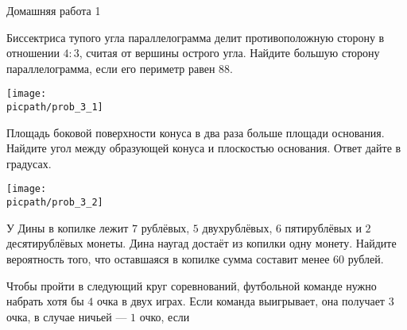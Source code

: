 \begin{class}[number=2]
	\begin{listofex}
		\item 
	\end{listofex}
\end{class}

\begin{homework}[number=1]
	\begin{listofex}
		\item Домашняя работа 1
	\end{listofex}
\end{homework}

\begin{class}[number=3]
	\begin{listofex}
		\item
		\begin{minipage}[t]{\bodywidth}
			Биссектриса тупого угла параллелограмма делит противоположную сторону в отношении \( 4 : 3 \), считая от вершины острого угла. Найдите большую сторону параллелограмма, если его периметр равен \( 88 \).
			\foranswer
		\end{minipage}
		\gapwidth
		\begin{minipage}[t]{\picwidth}
			\texttt{[image: \\picpath/prob\_3\_1]}
		\end{minipage}
		\item
		\begin{minipage}[t]{\bodywidth}
			Площадь боковой поверхности конуса в два раза больше площади основания. Найдите угол между образующей конуса и плоскостью основания. Ответ дайте в градусах.
			\foranswer
		\end{minipage}
		\gapwidth
		\begin{minipage}[t]{\picwidth}
			\texttt{[image: \\picpath/prob\_3\_2]}
		\end{minipage}
		\item У Дины в копилке лежит \( 7 \) рублёвых, \( 5 \) двухрублёвых, \( 6 \) пятирублёвых и \( 2 \) десятирублёвых
		монеты. Дина наугад достаёт из копилки одну монету. Найдите вероятность того, что оставшаяся в
		копилке сумма составит менее \( 60 \) рублей.
		\foranswer
		\item Чтобы пройти в следующий круг соревнований, футбольной команде нужно набрать хотя бы \( 4 \)
		очка в двух играх. Если команда выигрывает, она получает \( 3 \) очка, в случае ничьей --- \( 1 \) очко, если

\end{listofex}
\end{class}
